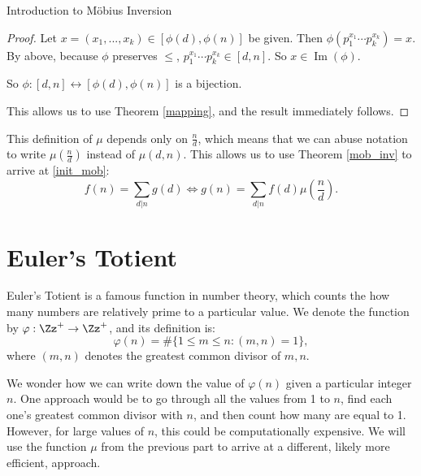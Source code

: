 \documentclass[12pt]{pom_thesis}
\DeclareMathOperator{\im}{Im}
\begin{document}
\begin{chapter}{Introduction to M\"obius Inversion}
\begin{proof}
Let $x = (x_1,...,x_k) \in [\phi(d), \phi(n)]$ be given. Then $\phi(p_1^{x_1}\cdots p_k^{x_k}) = x$. By above, because $\phi$ preserves $\leq$, $p_1^{x_1}\cdots p_k^{x_k} \in [d,n]$. So $x \in \im(\phi)$. 

So $\phi:[d,n] \leftrightarrow [\phi(d), \phi(n)]$ is a bijection.

This allows us to use Theorem \ref{mapping}, and the result immediately follows.
\end{proof}

This definition of $\mu$ depends only on $\frac nd$, which means that we can abuse notation to write $\mu(\frac nd)$ instead of $\mu(d,n)$. This allows us to use Theorem \ref{mob_inv} to arrive at \eqref{init_mob}:
\[
f(n) = \sum_{d | n} g(d) \iff g(n) = \sum_{d | n}  f(d)\mu\left(\frac nd\right).
\]
\section{Euler's Totient}
Euler's Totient is a famous function in number theory, which counts the how many numbers are relatively prime to a particular value. We denote the function by $\varphi : \Zz^+ \rightarrow \Zz^+$, and its definition is:
\[
\varphi(n) = \#\{1 \leq m \leq n : (m,n) = 1\},
\]
where $(m,n)$ denotes the greatest common divisor of $m,n$.

We wonder how we can write down the value of $\varphi(n)$ given a particular integer $n$. One approach would be to go through all the values from 1 to $n$, find each one's greatest common divisor with $n$, and then count how many are equal to 1. However, for large values of $n$, this could be computationally expensive. We will use the function $\mu$ from the previous part to arrive at a different, likely more efficient, approach.


\end{chapter}
\end{document}
